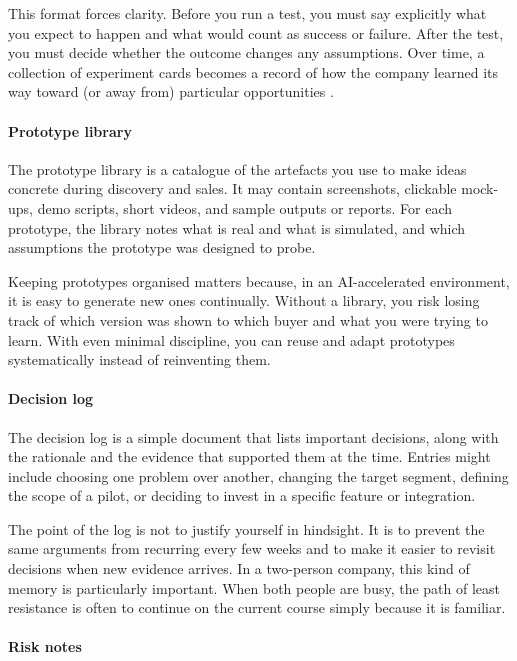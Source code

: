 \documentclass[10pt, a4paper, twocolumn]{article} %
\begin{document}
This format forces clarity. Before you run a test, you must say explicitly what you expect to happen and what would count as success or failure. After the test, you must decide whether the outcome changes any assumptions. Over time, a collection of experiment cards becomes a record of how the company learned its way toward (or away from) particular opportunities \citep{bland2019testing}.

\paragraph{Prototype library}

The prototype library is a catalogue of the artefacts you use to make ideas concrete during discovery and sales. It may contain screenshots, clickable mock-ups, demo scripts, short videos, and sample outputs or reports. For each prototype, the library notes what is real and what is simulated, and which assumptions the prototype was designed to probe.

Keeping prototypes organised matters because, in an AI-accelerated environment, it is easy to generate new ones continually. Without a library, you risk losing track of which version was shown to which buyer and what you were trying to learn. With even minimal discipline, you can reuse and adapt prototypes systematically instead of reinventing them.

\newpage
\paragraph{Decision log}

The decision log is a simple document that lists important decisions, along with the rationale and the evidence that supported them at the time. Entries might include choosing one problem over another, changing the target segment, defining the scope of a pilot, or deciding to invest in a specific feature or integration.

The point of the log is not to justify yourself in hindsight. It is to prevent the same arguments from recurring every few weeks and to make it easier to revisit decisions when new evidence arrives. In a two-person company, this kind of memory is particularly important. When both people are busy, the path of least resistance is often to continue on the current course simply because it is familiar.

\paragraph{Risk notes}
\end{document}
